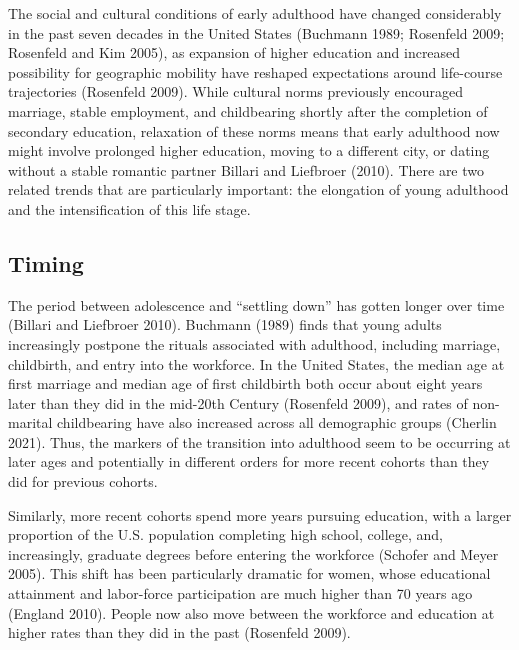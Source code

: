 \documentclass[
  12pt,
]{article}
\begin{document}
The social and cultural conditions of early adulthood have changed considerably in the past seven decades in the United States (Buchmann 1989; Rosenfeld 2009; Rosenfeld and Kim 2005), as expansion of higher education and increased possibility for geographic mobility have reshaped expectations around life-course trajectories (Rosenfeld 2009). While cultural norms previously encouraged marriage, stable employment, and childbearing shortly after the completion of secondary education, relaxation of these norms means that early adulthood now might involve prolonged higher education, moving to a different city, or dating without a stable romantic partner Billari and Liefbroer (2010). There are two related trends that are particularly important: the elongation of young adulthood and the intensification of this life stage.

\hypertarget{timing}{%
\subsection{Timing}\label{timing}}

The period between adolescence and ``settling down'' has gotten longer over time (Billari and Liefbroer 2010). Buchmann (1989) finds that young adults increasingly postpone the rituals associated with adulthood, including marriage, childbirth, and entry into the workforce. In the United States, the median age at first marriage and median age of first childbirth both occur about eight years later than they did in the mid-20th Century (Rosenfeld 2009), and rates of non-marital childbearing have also increased across all demographic groups (Cherlin 2021). Thus, the markers of the transition into adulthood seem to be occurring at later ages and potentially in different orders for more recent cohorts than they did for previous cohorts.

Similarly, more recent cohorts spend more years pursuing education, with a larger proportion of the U.S. population completing high school, college, and, increasingly, graduate degrees before entering the workforce (Schofer and Meyer 2005). This shift has been particularly dramatic for women, whose educational attainment and labor-force participation are much higher than 70 years ago (England 2010). People now also move between the workforce and education at higher rates than they did in the past (Rosenfeld 2009).
\end{document}
